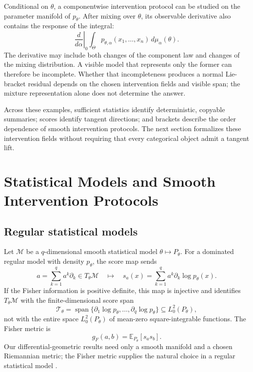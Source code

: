 \documentclass{article}
\theoremstyle{plain}
\theoremstyle{definition}
\theoremstyle{remark}
\newcommand{\M}{\mathcal M}
\newcommand{\Span}{\operatorname{span}}
\begin{document}
Conditional on \(\theta\), a componentwise intervention protocol can be
studied on the parameter manifold of \(p_\theta\).  After mixing over
\(\theta\), its observable derivative also contains the response of the
integral:
\[
  \left.\frac{d}{d\alpha}\right|_0
  \int_\Theta
  p_{\theta,\alpha}(x_1,\ldots,x_n)\,d\mu_\alpha(\theta).
\]
The derivative may include both changes of the component law and changes of
the mixing distribution.  A visible model that represents only the former can
therefore be incomplete.  Whether that incompleteness produces a normal
Lie-bracket residual depends on the chosen intervention fields and visible
span; the mixture representation alone does not determine the answer.

Across these examples, sufficient statistics identify deterministic,
copyable summaries; scores identify tangent directions; and brackets describe
the order dependence of smooth intervention protocols.  The next section
formalizes these intervention fields without requiring that every categorical
object admit a tangent lift.

\section{Statistical Models and Smooth Intervention Protocols}
\label{sec:protocols}

\subsection{Regular statistical models}

Let \(\M\) be a \(q\)-dimensional smooth statistical model
\(\theta\mapsto P_\theta\).  For a dominated regular model with density
\(p_\theta\), the score map sends
\[
  a=\sum_{k=1}^q a^k\partial_k\in T_\theta\M
  \quad\longmapsto\quad
  s_a(x)=\sum_{k=1}^q a^k\partial_k\log p_\theta(x).
\]
If the Fisher information is positive definite, this map is injective and
identifies \(T_\theta\M\) with the finite-dimensional score span
\[
  \mathcal T_\theta
  =
  \Span\{\partial_1\log p_\theta,\ldots,\partial_q\log p_\theta\}
  \subseteq L_0^2(P_\theta),
\]
not with the entire space \(L_0^2(P_\theta)\) of mean-zero square-integrable
functions.  The Fisher metric is
\[
  g_F(a,b)=\mathbb E_{P_\theta}[s_a s_b].
\]
Our differential-geometric results need only a smooth manifold and a chosen
Riemannian metric; the Fisher metric supplies the natural choice in a regular
statistical model \citep{amari2016information}.
\end{document}
